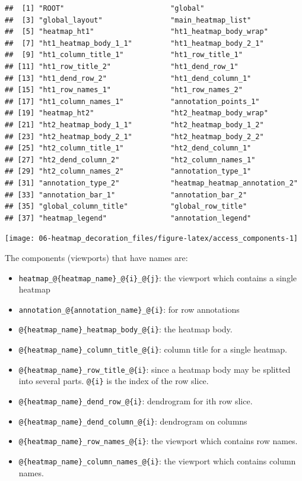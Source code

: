\documentclass[]{book}
\providecommand{\tightlist}{%
  \setlength{\itemsep}{0pt}\setlength{\parskip}{0pt}}
\theoremstyle{definition}
\theoremstyle{definition}
\theoremstyle{definition}
\theoremstyle{remark}
\begin{document}
\begin{verbatim}
##  [1] "ROOT"                         "global"                      
##  [3] "global_layout"                "main_heatmap_list"           
##  [5] "heatmap_ht1"                  "ht1_heatmap_body_wrap"       
##  [7] "ht1_heatmap_body_1_1"         "ht1_heatmap_body_2_1"        
##  [9] "ht1_column_title_1"           "ht1_row_title_1"             
## [11] "ht1_row_title_2"              "ht1_dend_row_1"              
## [13] "ht1_dend_row_2"               "ht1_dend_column_1"           
## [15] "ht1_row_names_1"              "ht1_row_names_2"             
## [17] "ht1_column_names_1"           "annotation_points_1"         
## [19] "heatmap_ht2"                  "ht2_heatmap_body_wrap"       
## [21] "ht2_heatmap_body_1_1"         "ht2_heatmap_body_1_2"        
## [23] "ht2_heatmap_body_2_1"         "ht2_heatmap_body_2_2"        
## [25] "ht2_column_title_1"           "ht2_dend_column_1"           
## [27] "ht2_dend_column_2"            "ht2_column_names_1"          
## [29] "ht2_column_names_2"           "annotation_type_1"           
## [31] "annotation_type_2"            "heatmap_heatmap_annotation_2"
## [33] "annotation_bar_1"             "annotation_bar_2"            
## [35] "global_column_title"          "global_row_title"            
## [37] "heatmap_legend"               "annotation_legend"
\end{verbatim}

\begin{center}\texttt{[image: 06-heatmap\_decoration\_files/figure-latex/access\_components-1]} \end{center}

The components (viewports) that have names are:

\begin{itemize}
\tightlist
\item
  \texttt{heatmap\_@\{heatmap\_name\}\_@\{i\}\_@\{j\}}: the viewport
  which contains a single heatmap
\item
  \texttt{annotation\_@\{annotation\_name\}\_@\{i\}}: for row
  annotations
\item
  \texttt{@\{heatmap\_name\}\_heatmap\_body\_@\{i\}}: the heatmap body.
\item
  \texttt{@\{heatmap\_name\}\_column\_title\_@\{i\}}: column title for a
  single heatmap.
\item
  \texttt{@\{heatmap\_name\}\_row\_title\_@\{i\}}: since a heatmap body
  may be splitted into several parts. \texttt{@\{i\}} is the index of
  the row slice.
\item
  \texttt{@\{heatmap\_name\}\_dend\_row\_@\{i\}}: dendrogram for ith row
  slice.
\item
  \texttt{@\{heatmap\_name\}\_dend\_column\_@\{i\}}: dendrogram on
  columns
\item
  \texttt{@\{heatmap\_name\}\_row\_names\_@\{i\}}: the viewport which
  contains row names.
\item
  \texttt{@\{heatmap\_name\}\_column\_names\_@\{i\}}: the viewport which
  contains column names.
\end{itemize}
\end{document}
